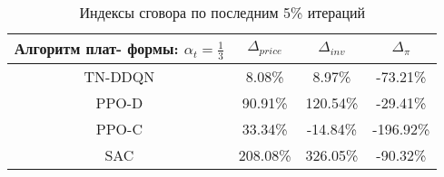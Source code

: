 \bgroup
\def\arraystretch{1.25}
\begin{table}[H]
	\caption{Индексы сговора по последним 5\% итераций}
	\label{tables:platforms_fixed}
	\begin{center}
		\vspace{-0.5em}
		\begin{tabular}{c||ccc}
			\toprule
			\makecell{Алгоритм плат-\\ формы: $\alpha_t = \frac{1}{3}$} & $\Delta_{price}$ & $\Delta_{inv}$ & $\Delta_{\pi}$ \\
			\midrule
			TN-DDQN & 8.08\% & 8.97\% & -73.21\% \\
			PPO-D & 90.91\% & 120.54\% & -29.41\% \\
			PPO-C & 33.34\% & -14.84\% & -196.92\% \\
			SAC & 208.08\% & 326.05\% & -90.32\% \\
			\bottomrule
		\end{tabular}
	\end{center}
\end{table}
\egroup